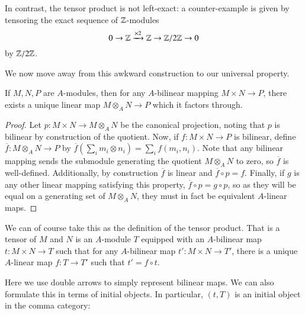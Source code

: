 In contrast, the tensor product is not left-exact: a counter-example is given by tensoring the exact sequence of $\mathbb Z$-modules \begin{equation*}
    0\rightarrow \mathbb Z\xrightarrow{\times 2}\mathbb Z\rightarrow \mathbb Z/2\mathbb Z\rightarrow 0
\end{equation*}
by $\mathbb Z/2\mathbb Z$.

We now move away from this awkward construction to our universal property.

\begin{theorem}
    If $M,N,P$ are $A$-modules, then for any $A$-bilinear mapping $M\times N\rightarrow P$, there exists a unique linear map $M\otimes_AN\rightarrow P$ which it factors through.
\end{theorem}
\begin{proof}
    Let $p:M\times N\rightarrow M\otimes_AN$ be the canonical projection, noting that $p$ is bilinear by construction of the quotient. Now, if $f:M\times N\rightarrow P$ is bilinear, define $\overline{f}:M\otimes_AN\rightarrow P$ by $\overline{f}\left(\sum_im_i\otimes n_i\right) = \sum_if(m_i,n_i)$. Note that any bilinear mapping sends the submodule generating the quotient $M\otimes_AN$ to zero, so $\overline{f}$ is well-defined. Additionally, by construction $\overline{f}$ is linear and $\overline{f}\circ p = f$. Finally, if $g$ is any other linear mapping satisfying this property, $\overline{f} \circ p = g \circ p$, so as they will be equal on a generating set of $M\otimes_AN$, they must in fact be equivalent $A$-linear maps.
\end{proof}

We can of course take this as the definition of the tensor product. That is a tensor of $M$ and $N$ is an $A$-module $T$ equipped with an $A$-bilinear map $t:M\times N\rightarrow T$ such that for any $A$-bilinear map $t':M\times N\rightarrow T'$, there is a unique $A$-linear map $f:T\rightarrow T'$ such that $t' = f\circ t$. 
\begin{center}
\end{center}
Here we use double arrows to simply represent bilinear maps. We can also formulate this in terms of initial objects. In particular, $(t,T)$ is an initial object in the comma category:

